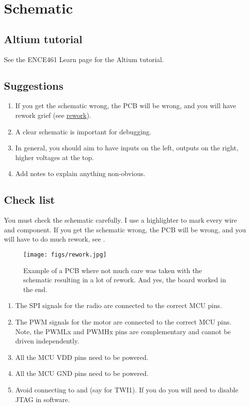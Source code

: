 \chapter{Schematic}


\section{Altium tutorial}


See the ENCE461 Learn page for the Altium tutorial.


\section{Suggestions}

\begin{enumerate}
\item If you get the schematic wrong, the PCB will be wrong, and you
  will have rework grief (see \hyperref[rework]{rework}).

\item A clear schematic is important for debugging.

\item In general, you should aim to have inputs on the left, outputs
  on the right, higher voltages at the top.

\item Add notes to explain anything non-obvious.
\end{enumerate}



\section{Check list}
\label{schematic-check-list}

You must check the schematic carefully.  I use a highlighter to mark
every wire and component.  If you get the schematic wrong, the PCB
will be wrong, and you will have to do much rework, see
.


\begin{figure}[!h]
  \centering
  \texttt{[image: figs/rework.jpg]}
  \caption{Example of a PCB where not much care was taken with the
    schematic resulting in a lot of rework.  And yes, the board worked
    in the end.}
  \label{fig:rework}
\end{figure}



\begin{enumerate}
\item
  The SPI signals for the radio are connected to the correct MCU pins.
\item
  The PWM signals for the motor are connected to the correct MCU pins.
  Note, the PWMLx and PWMHx pins are complementary and cannot be driven
  independently.
\item
  All the MCU VDD pins need to be powered.
\item
  All the MCU GND pins need to be powered.
\item
  Avoid connecting to  and  (say for TWI1).  If you
  do you will need to disable JTAG in software.
\end{enumerate}
